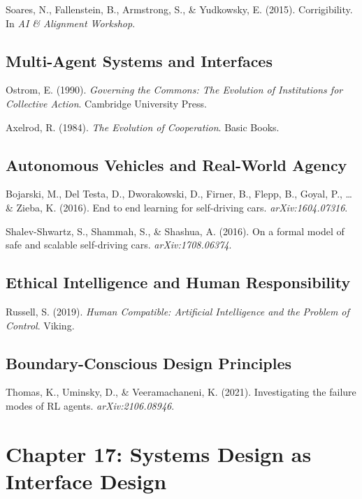 \documentclass[
  openright]{book}
\begin{document}
Soares, N., Fallenstein, B., Armstrong, S., \& Yudkowsky, E. (2015).
Corrigibility. In \emph{AI \& Alignment Workshop}.

\subsection{Multi-Agent Systems and
Interfaces}\label{multi-agent-systems-and-interfaces}

Ostrom, E. (1990). \emph{Governing the Commons: The Evolution of
Institutions for Collective Action}. Cambridge University Press.

Axelrod, R. (1984). \emph{The Evolution of Cooperation}. Basic Books.

\subsection{Autonomous Vehicles and Real-World
Agency}\label{autonomous-vehicles-and-real-world-agency}

Bojarski, M., Del Testa, D., Dworakowski, D., Firner, B., Flepp, B.,
Goyal, P., \ldots{} \& Zieba, K. (2016). End to end learning for
self-driving cars. \emph{arXiv:1604.07316}.

Shalev-Shwartz, S., Shammah, S., \& Shashua, A. (2016). On a formal
model of safe and scalable self-driving cars. \emph{arXiv:1708.06374}.

\subsection{Ethical Intelligence and Human
Responsibility}\label{ethical-intelligence-and-human-responsibility}

Russell, S. (2019). \emph{Human Compatible: Artificial Intelligence and
the Problem of Control}. Viking.

\subsection{Boundary-Conscious Design
Principles}\label{boundary-conscious-design-principles}

Thomas, K., Uminsky, D., \& Veeramachaneni, K. (2021). Investigating the
failure modes of RL agents. \emph{arXiv:2106.08946}.

\section{Chapter 17: Systems Design as Interface
Design}\label{chapter-17-systems-design-as-interface-design}
\end{document}
